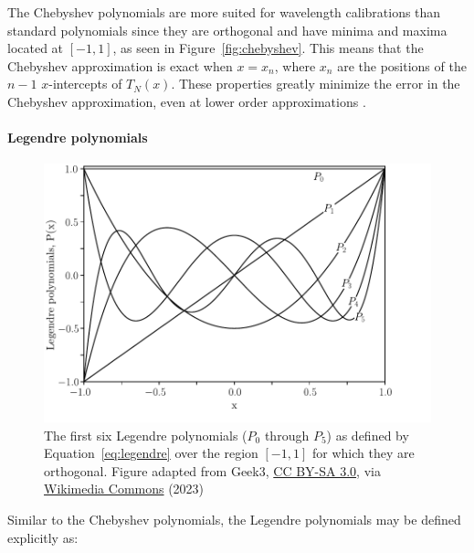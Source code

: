 

The Chebyshev polynomials are more suited for wavelength calibrations than standard polynomials since they are orthogonal and have minima and maxima located at $[-1, 1]$, as seen in Figure~\ref{fig:chebyshev}. This means that the Chebyshev approximation is exact when $x = x_{n}$, where $x_{n}$ are the positions of the $n - 1$ $x$-intercepts of $T_{N}(x)$. These properties greatly minimize the error in the Chebyshev approximation, even at lower order approximations \citep{cheby}.


\paragraph{Legendre polynomials}

\begin{figure}[t]
    \centering
    \includegraphics[width = 12cm]{figures/2_legendre.pdf}
    \caption{The first six Legendre polynomials ($P_0$ through $P_{5}$) as defined by Equation~\ref{eq:legendre} over the region $[-1, 1]$ for which they are orthogonal. Figure adapted from Geek3, \protect\href{https://creativecommons.org/licenses/by-sa/3.0}{CC BY-SA 3.0}, via \protect\href{https://commons.wikimedia.org/wiki/File:Legendrepolynomials6.svg}{Wikimedia Commons} (2023)}
    \label{fig:legendre}
\end{figure}

Similar to the Chebyshev polynomials, the Legendre polynomials may be defined explicitly as:

